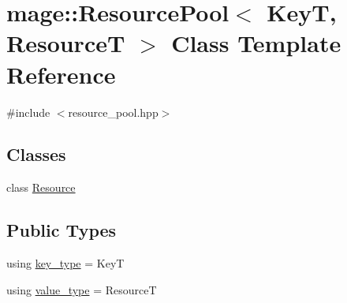 \hypertarget{classmage_1_1_resource_pool}{}\section{mage\+:\+:Resource\+Pool$<$ KeyT, ResourceT $>$ Class Template Reference}
\label{classmage_1_1_resource_pool}


{\ttfamily \#include $<$resource\+\_\+pool.\+hpp$>$}

\subsection*{Classes}
\begin{DoxyCompactItemize}
\item 
class \hyperlink{classmage_1_1_resource_pool_1_1_resource}{Resource}
\end{DoxyCompactItemize}
\subsection*{Public Types}
\begin{DoxyCompactItemize}
\item 
using \hyperlink{classmage_1_1_resource_pool_adef3060db9bd6ffd8f46abd35afebae5}{key\+\_\+type} = KeyT
\item 
using \hyperlink{classmage_1_1_resource_pool_a5297ef9d8f854a606391ace5a9746a85}{value\+\_\+type} = ResourceT
\end{DoxyCompactItemize}
